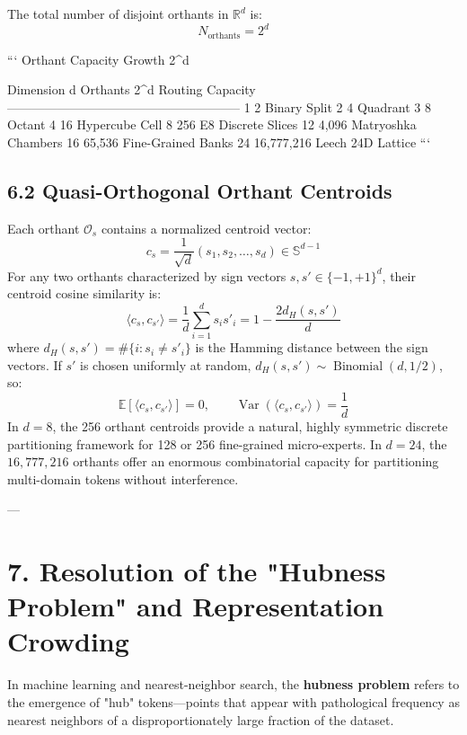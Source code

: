 \documentclass[11pt,twoside,openright]{amsbook}
\begin{document}
The total number of disjoint orthants in $\mathbb{R}^d$ is:
$$N_{\text{orthants}} = 2^d$$

```
                         Orthant Capacity Growth 2^d
                                     
           Dimension d        Orthants 2^d       Routing Capacity
           --------------------------------------------------------
               1                   2             Binary Split
               2                   4             Quadrant
               3                   8             Octant
               4                  16             Hypercube Cell
               8                 256             E8 Discrete Slices
              12               4,096             Matryoshka Chambers
              16              65,536             Fine-Grained Banks
              24          16,777,216             Leech 24D Lattice
```

\subsection{6.2 Quasi-Orthogonal Orthant Centroids}

Each orthant $\mathcal{O}_s$ contains a normalized centroid vector:
$$c_s = \frac{1}{\sqrt{d}} \left( s_1, s_2, \dots, s_d \right) \in \mathbb{S}^{d-1}$$
For any two orthants characterized by sign vectors $s, s' \in \{-1, +1\}^d$, their centroid cosine similarity is:
$$\langle c_s, c_{s'} \rangle = \frac{1}{d} \sum_{i=1}^d s_i s'_i = 1 - \frac{2 d_H(s, s')}{d}$$
where $d_H(s, s') = \#\{i : s_i \ne s'_i\}$ is the Hamming distance between the sign vectors.
If $s'$ is chosen uniformly at random, $d_H(s, s') \sim \operatorname{Binomial}(d, 1/2)$, so:
$$\mathbb{E}[\langle c_s, c_{s'} \rangle] = 0, \qquad \operatorname{Var}(\langle c_s, c_{s'} \rangle) = \frac{1}{d}$$
In $d = 8$, the 256 orthant centroids provide a natural, highly symmetric discrete partitioning framework for 128 or 256 fine-grained micro-experts. In $d = 24$, the $16,777,216$ orthants offer an enormous combinatorial capacity for partitioning multi-domain tokens without interference.

---

\section{7. Resolution of the "Hubness Problem" and Representation Crowding}

In machine learning and nearest-neighbor search, the \textbf{hubness problem} refers to the emergence of "hub" tokens—points that appear with pathological frequency as nearest neighbors of a disproportionately large fraction of the dataset.
\end{document}

